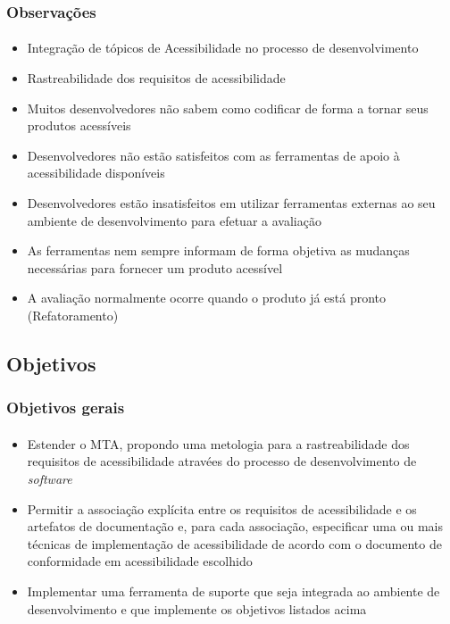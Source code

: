 \documentclass{beamer}
\begin{document}
\begin{frame}[allowframebreaks]
\frametitle{Observações}
\framesubtitle{}

\begin{itemize}
  \item Integração de tópicos de Acessibilidade no processo de desenvolvimento \citep{springerlink:10.1007/978-3-642-02713-0,maia:10}
  \item Rastreabilidade dos requisitos de acessibilidade
  \item Muitos desenvolvedores não sabem como codificar de forma a tornar seus produtos acessíveis \citep{1630123,alves:11}
  \item Desenvolvedores não estão satisfeitos com as ferramentas de apoio à acessibilidade disponíveis \citep{Trewin:2010:ACT:1805986.1806029}
  \item Desenvolvedores estão insatisfeitos em utilizar ferramentas externas ao
seu ambiente de desenvolvimento para efetuar a avaliação \citep{Trewin:2010:ACT:1805986.1806029}
  \item As ferramentas nem sempre informam de forma objetiva as mudanças necessárias para fornecer um produto acessível \citep{groves:12}
  \item A avaliação normalmente ocorre quando o produto já está pronto (Refatoramento)  
\end{itemize}

\end{frame}

\subsection[Objetivos]{Objetivos}

\begin{frame}
\frametitle{Objetivos gerais}
\framesubtitle{}

\begin{itemize}
 \item Estender o MTA, propondo uma metologia para a rastreabilidade dos requisitos de acessibilidade atravées do processo de desenvolvimento de \textit{software}
 \item Permitir a associação explícita entre os requisitos de acessibilidade e os artefatos de documentação e, para cada associação, especificar uma ou mais técnicas de implementação de acessibilidade de acordo com o documento de conformidade em acessibilidade escolhido
 \item Implementar uma ferramenta de suporte que seja integrada ao ambiente de desenvolvimento e que implemente os objetivos listados acima
\end{itemize}

\end{frame}
\end{document}
